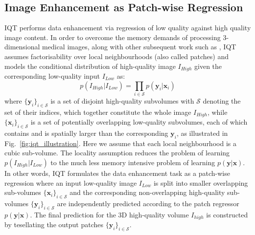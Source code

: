 \subsection{Image Enhancement as Patch-wise Regression}
IQT performs data enhancement via regression of low quality against high quality image content. In order to overcome the memory demands of processing 3-dimensional medical images, along with other subsequent work such as \cite{yang2016fast,oktay2016multi,bahrami2016convolutional,oktay2018anatomically}, IQT assumes factorisability over local neighbourhoods (also called patches) and models the conditional distribution of high-quality image $I_{High}$ given the corresponding low-quality input $I_{Low}$ as: 
\begin{equation}
p(I_{High}|I_{Low}) = \prod_{i\in \mathcal{S}} p(\mathbf{y}_{i}|\mathbf{x}_{i})
\end{equation}
where $\{\textbf{y}_{i}\}_{i \in \mathcal{S}}$ is a set of disjoint high-quality subvolumes with $\mathcal{S}$ denoting the set of their indices, which together constitute the whole image $I_{High}$, while $\{\textbf{x}_{i}\}_{i \in \mathcal{S}}$ is a set of potentially overlapping low-quality subvolumes, each of which contains and is spatially larger than the corresponding $\textbf{y}_{i}$, as illustrated in Fig.~\ref{fig:iqt_illustration}. Here we assume that each local neighbourhood is a cubic sub-volume. The locality assumption reduces the problem of learning $p(I_{High}|I_{Low})$ to the much less memory intensive problem of learning $p(\mathbf{y}|\mathbf{x})$. In other words, IQT formulates the data enhancement task as a patch-wise regression where an input low-quality image $I_{Low}$ is split into smaller overlapping sub-volumes  $\{\textbf{x}_{i}\}_{i \in \mathcal{S}}$ and the corresponding non-overlapping high-quality sub-volumes $\{\textbf{y}_{i}\}_{i \in \mathcal{S}}$ are independently predicted according to the patch regressor $p(\mathbf{y}|\mathbf{x})$. The final prediction for the 3D high-quality volume $I_{high}$ is constructed by tesellating the output patches $\{\textbf{y}_{i}\}_{i \in \mathcal{S}}$. 

